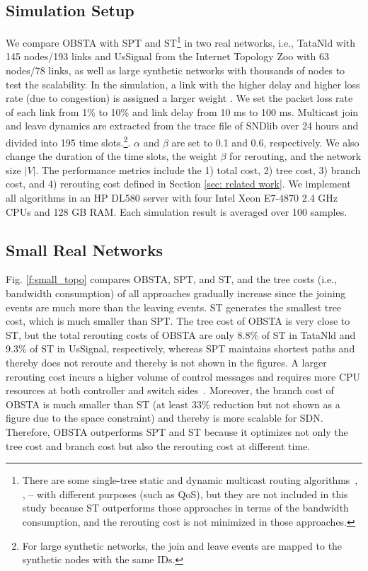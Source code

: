 \documentclass[10pt, conference, letterpaper]{IEEEtran}
\theoremstyle{definition}
\begin{document}
\subsection{Simulation Setup}
We compare OBSTA with SPT and ST\footnote{There are some single-tree static and dynamic multicast routing algorithms~\cite{UnicastTunnelForMulticast3}, \cite{reliableMulticastforSDN},  \cite{dynamic_multicast_mobile_ip}--\cite{dynamic_multicast_network_coding} with different purposes (such as QoS), but they are not included in this study because ST outperforms those approaches in terms of the bandwidth consumption, and the rerouting cost is not minimized in those approaches.} in two real networks, i.e., TataNld with 145 nodes/193 links and UsSignal from the Internet Topology Zoo with 63 nodes/78 links, as well as large synthetic networks with thousands of nodes to test the scalability. In the simulation, {\color{black}a link with the higher delay and higher loss rate (due to congestion) is assigned a larger weight \cite{LinkWeightSetting
}.} We set the packet loss rate of each link from 1\% to 10\% and link delay from 10 ms to 100 ms. Multicast join and leave dynamics are extracted from the trace file of SNDlib over 24 hours and divided into 195 time slots.\footnote{For large synthetic networks, the join and leave events are mapped to the synthetic nodes with the same IDs.}. $\alpha$ and $\beta$ are set to 0.1 and 0.6, respectively. We also change the duration of the time slots, the weight $\beta$ for rerouting, and the network size $|V|$. The performance metrics include the 1) total cost, 2) tree cost, 3) branch cost, and 4) rerouting cost defined in Section \ref{sec: related work}. We implement all algorithms in an HP DL580 server with four Intel Xeon E7-4870 2.4 GHz CPUs and 128 GB RAM. Each simulation result is averaged over 100 samples.

\subsection{Small Real Networks}
Fig. \ref{f:small_topo} compares OBSTA, SPT, and ST, and the tree costs (i.e., bandwidth consumption) of all approaches gradually increase since the joining events are much more than the leaving events. ST generates the smallest tree cost, which is much smaller than SPT. The tree cost of OBSTA is very close to ST, but the total rerouting costs of OBSTA are only 8.8\% of ST in TataNld and 9.3\% of ST in UsSignal, respectively, whereas SPT maintains shortest paths and thereby does not reroute and thereby is not shown in the figures. A larger rerouting cost incurs a higher volume of control messages and requires more CPU resources at both controller and switch sides~\cite{devoflow}. Moreover, the branch cost of OBSTA is much smaller than ST (at least 33\% reduction but not shown as a figure due to the space constraint) and thereby is more scalable for SDN. Therefore, OBSTA outperforms SPT and ST because it optimizes not only the tree cost and branch cost but also the rerouting cost at different time. %
\end{document}
